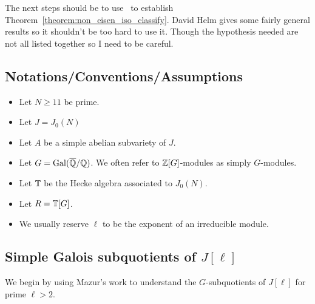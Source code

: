 \documentclass{article}
\begin{document}
The next steps should be to use~\cite[Corollary 4.8]{MR2342491} to establish
Theorem~\ref{theorem:non_eisen_iso_classify}. David Helm gives some fairly
general results so it shouldn't be too hard to use it. Though the hypothesis
needed are not all listed together so I need to be careful.


\subsection{Notations/Conventions/Assumptions}

\begin{itemize}
    \item
        Let $N\geq 11$ be prime.
    \item
        Let $J=J_0(N)$
    \item
        Let $A$ be a simple abelian subvariety of $J$.
    \item
        Let $G=\operatorname{Gal}(\overline{\mathbb{Q}}/\mathbb{Q})$. We often refer to $\mathbb{Z}[G]$-modules as simply
        $G$-modules.
    \item
        Let $\mathbb{T}$ be the Hecke algebra associated to $J_0(N)$.
    \item
        Let $R=\mathbb{T}[G]$.
    \item
        We usually reserve $\ell$ to be the exponent of an irreducible module.
\end{itemize}

\subsection{Simple Galois subquotients of $J[\ell]$}

We begin by using Mazur's work to understand the $G$-subquotients of $J[\ell]$
for prime $\ell>2$.
\end{document}
